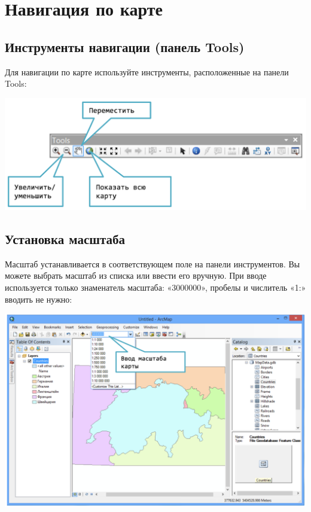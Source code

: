 \documentclass[12pt,]{book}
\begin{document}
\hypertarget{manual-navigation}{%
\chapter{Навигация по карте}\label{manual-navigation}}

\hypertarget{tools}{%
\section{Инструменты навигации (панель Tools)}\label{tools}}

Для навигации по карте используйте инструменты, расположенные на панели Tools:

\includegraphics{images/Appendix/image4.png}

\hypertarget{section-20}{%
\section{Установка масштаба}\label{section-20}}

Масштаб устанавливается в соответствующем поле на панели инструментов. Вы можете выбрать масштаб из списка или ввести его вручную. При вводе используется только знаменатель масштаба: «3000000», пробелы и числитель «1:» вводить не нужно:

\includegraphics{images/Appendix/image5.png}
\end{document}
